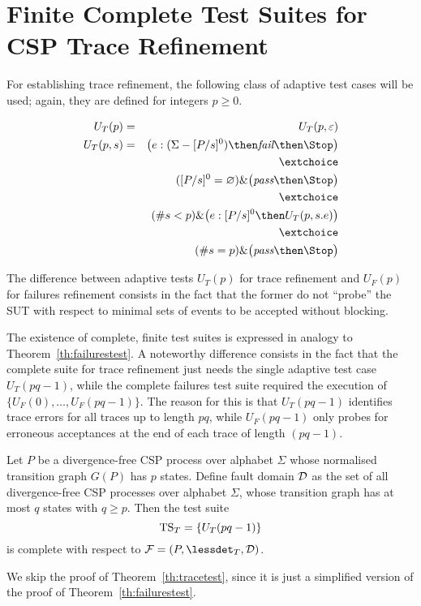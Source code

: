 \section{Finite Complete Test Suites for CSP Trace Refinement}
\label{sec:finitecomplete}

For establishing trace refinement, the following class of adaptive test cases will be used; again, they are defined for integers $p \ge 0$.


\begin{eqnarray}
U_T(p) & = & U_T(p,\varepsilon)
\\
U_T(p,s) & = & \big( e:(\Sigma - [P/s]^0) \then \efail\then \Stop \big)
\label{eq:ufa}
\\ & & \extchoice \nonumber
\\ & & ([P/s]^0 = \varnothing)    \&   \big( \epass \then \Stop \big)
\label{eq:ufb}
\\ & & \extchoice \nonumber
\\ & & (\#s < p) \& \big( e:[P/s]^0 \then U_T(p,s.e) \big)
\label{eq:ufc}
\\ & & \extchoice \nonumber
\\ & & (\#s = p) \& \big( \epass\then \Stop  \big)
\label{eq:ufd}
\end{eqnarray}


The difference between adaptive tests $U_T(p)$ for trace refinement and
$U_F(p)$ for failures refinement consists in the fact that the former do not ``probe''
the SUT with respect to minimal sets of events to be accepted without blocking. 

The existence of complete, finite test suites is expressed in analogy to Theorem~\ref{th:failurestest}. A noteworthy difference consists in the fact that
the complete suite for trace refinement just needs the single adaptive test case 
$U_T(pq-1)$, while the complete failures test suite required the execution of 
$\{ U_F(0),\dots,U_F(pq-1)\}$. The reason for this is that $U_T(pq-1)$ identifies trace
errors for all traces up to length $pq$, while $U_F(pq-1)$ only probes for erroneous
acceptances at the end of each trace of length $(pq -1)$.

\begin{theorem}\label{th:tracetest}
Let $P$ be a divergence-free CSP process over alphabet $\Sigma$ 
whose normalised transition graph $G(P)$ has $p$ states. Define fault domain ${\cal D}$ as
the set of all divergence-free CSP processes over alphabet $\Sigma$, whose transition graph
has at most $q$ states with $q \ge p$. 
Then the test suite 
\[
{\text{TS}}_T = \{ U_T(pq-1)   \}
\]
is complete with respect to ${\cal F} = (P,\lessdet_T,{\cal D})$.
\xbox
\end{theorem}

We skip the proof of Theorem~\ref{th:tracetest}, since it is just a simplified version of 
the proof of Theorem~\ref{th:failurestest}.










